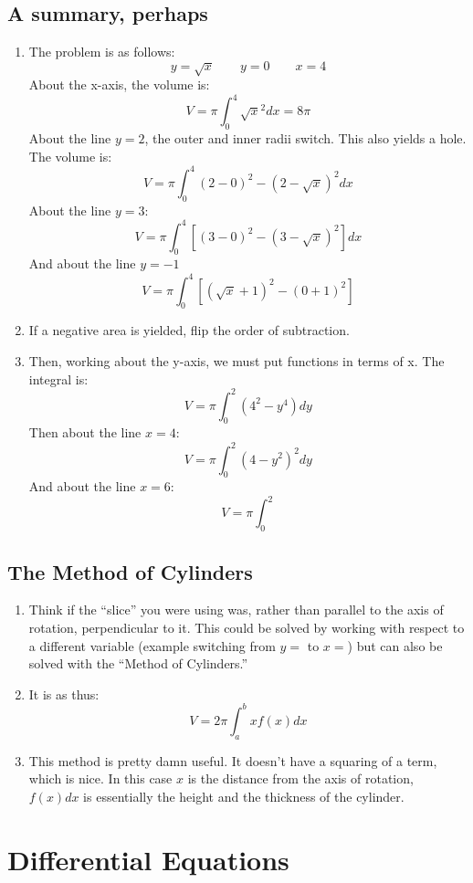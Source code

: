 \documentclass[11pt]{article}
\begin{document}
\subsection{A summary, perhaps}
\begin{enumerate}
	\item The problem is as follows:
		\[ y = \sqrt{x} \qquad y = 0 \qquad x = 4 \]
		About the x-axis, the volume is:
		\[ V = \pi \int_{0}^{4}\sqrt{x}^2 dx = 8\pi \]
		About the line $y = 2$, the outer and inner radii switch.  This also
		yields a hole.  The volume is:
		\[ V = \pi \int_{0}^{4}(2-0)^2-(2 - \sqrt{x})^2 dx \]
		About the line $y = 3$:
		\[ V = \pi \int_{0}^{4}\left[ (3 - 0)^2 - (3 - \sqrt{x})^2 \right] dx \]
		And about the line $y = -1$
		\[ V = \pi \int_{0}^{4}\left[ (\sqrt{x}+1)^2 - (0+1)^2\right] \]
	\item If a negative area is yielded, flip the order of subtraction.
	\item Then, working about the y-axis, we must put functions in terms of x.
		The integral is:
		\[ V = \pi\int_{0}^{2}(4^2 - y^4)dy \]
		Then about the line $x = 4$:
		\[ V = \pi \int_{0}^{2}(4 - y^2)^2 dy \]
		And about the line $x = 6$:
		\[ V = \pi \int_{0}^{2}\]
\end{enumerate}
\subsection{The Method of Cylinders}
\begin{enumerate}
	\item Think if the ``slice'' you were using was, rather than parallel to
		the axis of rotation, perpendicular to it.  This could be solved by
		working with respect to a different variable (example switching from 
		$y=$ to $x=$) but can also be solved  with the ``Method of Cylinders.''
	\item It is as thus:
		\[
			V = 2 \pi \int_{a}^{b}x f(x) dx
		\]
	\item This method is pretty damn useful.  It doesn't have a squaring 
		of a term, which is nice.  In this case $x$ is the distance from 
		the axis of rotation, $f(x)dx$ is essentially the height and the
		thickness of the cylinder.
\end{enumerate}

\section{Differential Equations}
\end{document}
